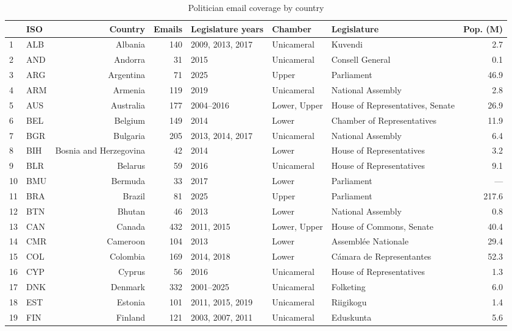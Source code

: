 \begin{table}[!htbp]
\centering
\scriptsize
\def\sym#1{\ifmmode^{#1}\else\(^{#1}\)\fi}
\caption{Politician email coverage by country}
\label{tab:tableone}
\begin{adjustbox}{max width=\linewidth}
\begin{tabular}{llrrlllr}
\toprule\toprule
& ISO & Country & Emails & Legislature years & Chamber & Legislature & Pop. (M) \\
\midrule
1 & ALB & Albania & 140 & 2009, 2013, 2017 & Unicameral & Kuvendi & 2.7 \\
2 & AND & Andorra & 31 & 2015 & Unicameral & Consell General & 0.1 \\
3 & ARG & Argentina & 71 & 2025 & Upper & Parliament & 46.9 \\
4 & ARM & Armenia & 119 & 2019 & Unicameral & National Assembly & 2.8 \\
5 & AUS & Australia & 177 & 2004--2016 & Lower, Upper & House of Representatives, Senate & 26.9 \\
6 & BEL & Belgium & 149 & 2014 & Lower & Chamber of Representatives & 11.9 \\
7 & BGR & Bulgaria & 205 & 2013, 2014, 2017 & Unicameral & National Assembly & 6.4 \\
8 & BIH & Bosnia and Herzegovina & 42 & 2014 & Lower & House of Representatives & 3.2 \\
9 & BLR & Belarus & 59 & 2016 & Unicameral & House of Representatives & 9.1 \\
10 & BMU & Bermuda & 33 & 2017 & Lower & Parliament & --- \\
11 & BRA & Brazil & 81 & 2025 & Upper & Parliament & 217.6 \\
12 & BTN & Bhutan & 46 & 2013 & Lower & National Assembly & 0.8 \\
13 & CAN & Canada & 432 & 2011, 2015 & Lower, Upper & House of Commons, Senate & 40.4 \\
14 & CMR & Cameroon & 104 & 2013 & Lower & Assemblée Nationale & 29.4 \\
15 & COL & Colombia & 169 & 2014, 2018 & Lower & Cámara de Representantes & 52.3 \\
16 & CYP & Cyprus & 56 & 2016 & Unicameral & House of Representatives & 1.3 \\
17 & DNK & Denmark & 332 & 2001--2025 & Unicameral & Folketing & 6.0 \\
18 & EST & Estonia & 101 & 2011, 2015, 2019 & Unicameral & Riigikogu & 1.4 \\
19 & FIN & Finland & 121 & 2003, 2007, 2011 & Unicameral & Eduskunta & 5.6 \\

\end{tabular}
\end{adjustbox}
\end{table}
